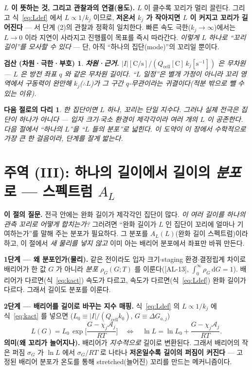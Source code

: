 \documentclass[11pt,a4paper]{article}
\newtheorem*{verifybox}{검산 (차원·극한·부호)}
\newtheorem*{bridgebox}{다음 절로의 다리}
\newcommand{\dd}{\mathrm{d}}
\newcommand{\cell}{\mathrm{cell}}
\newcommand{\AL}[1]{\textsf{[AL-#1]}}
\begin{document}
\textbf{$L$ 이 뜻하는 것, 그리고 관찰과의 연결(용도).} $L$ 이 클수록 꼬리가 멀리 끌린다. 그리고
식~\eqref{eq:Ldef} 에서 $L\propto1/k_j$ 이므로, \textbf{저온서 $k_j$ 가 작아지면 $L$ 이 커지고 꼬리가
길어진다} — 서 단계 (2)의 관찰과 정확히 일치한다. 빠른 속도 극한($k_j\to\infty$)에서는 $L\to0$ 이라 지연이
사라지고 진행률이 목표를 즉시 따라간다. \emph{이렇게 $L$ 하나로 ``꼬리 길이''를 모사할 수 있다} — 단, 아직
``하나의 집단(mode)''의 꼬리일 뿐이다.

\begin{verifybox}
\textbf{차원·근거.} $|I|[\mathrm{C/s}]/(Q_\cell[\mathrm C]\,k_j[\mathrm{s^{-1}}])$ 은 무차원 — $L$ 은 방전 좌표
$q$ 와 같은 무차원 길이다. ``$L$ 일정''은 별개 가정이 아니라 꼬리 영역에서 구동력이 완만해 $k_j$($\therefore
L$)가 그 구간 $q$-무관이라는 \emph{귀결}이다(적분 밖으로 뺄 수 있는 이유).
\end{verifybox}

\begin{bridgebox}
한 집단이면 $L$ 하나, 꼬리는 단일 지수다. 그러나 실제 전극은 집단이 하나가 아니다 — 입자 크기$\cdot$국소
환경이 제각각이라 \emph{여러 개의 $L$} 이 공존한다. 다음 절에서 ``하나의 $L$''을 ``$L$ 들의 분포''로 넓힌다.
이 도약이 이 장에서 수학적으로 가장 큰 한 걸음이라, 단계를 잘게 밟는다.
\end{bridgebox}

\section{주역 (III): 하나의 길이에서 길이의 \emph{분포}로 — 스펙트럼 $A_L$}\label{sec:spectrum}
\textbf{이 절의 질문.} 전극 안에는 완화 길이가 제각각인 집단이 많다. \emph{이 여러 길이를 하나의 관측 꼬리로
어떻게 합치는가?} 그러려면 ``완화 길이가 $L$ 인 집단이 꼬리에 얼마나 기여하는가''를 말해 주는 분포가
필요하다. 그 분포를 \textbf{$A_L(L)$}(완화 길이 스펙트럼)이라 하고, 이 절에서 \emph{새 물리를 넣지 않고} 이미
아는 배리어 분포에서 좌표만 바꿔 만든다.

\textbf{1단계 — 왜 분포인가(물리).} 같은 전이라도 입자 크기$\cdot$staging 환경$\cdot$결정립계 차이로 배리어가
한 값 $G$ 가 아니라 \emph{분포} $\rho_G(G;T)$ 를 이룬다(\AL{13}, $\int_0^\infty\rho_G\,\dd G=1$). 배리어가
다르면(식~\eqref{eq:kact}) 속도가 다르고, 속도가 다르면(식~\eqref{eq:Ldef}) 완화 길이가 다르다. 그래서 길이도
분포를 이룬다.

\textbf{2단계 — 배리어를 길이로 바꾸는 지수 매핑.} 식~\eqref{eq:Ldef} 의 $L\propto1/k_j$ 에 식~\eqref{eq:kact}
를 넣으면 ($L_0\equiv|I|/(Q_\cell k_0)$, $G\equiv\Delta G_{a,j}$)
\begin{equation}
L(G)=L_0\,\exp\!\Big[\frac{G-\chi_j\mathcal A_j}{RT}\Big]
\quad\Longleftrightarrow\quad
\ln L=\ln L_0+\frac{G-\chi_j\mathcal A_j}{RT}.
\label{eq:L_of_G}
\end{equation}
\textbf{의미(왜 꼬리가 늘어지나).} 배리어가 \emph{지수적으로} 길이로 변환된다. 그래서 배리어의 작은 퍼짐
$\sigma_G$ 가 $\ln L$ 에서 $\sigma_G/RT$ 로 나타나 \textbf{저온일수록 길이의 퍼짐이 커진다} — 고정된 배리어
분포가 온도를 통해 stretched(늘어진) 꼬리를 만드는 메커니즘이다.
\end{document}
